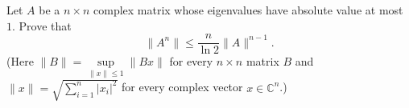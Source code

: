 \documentclass{article}
\begin{document}
\setlength{\parindent}{0pt}
Let $A$ be a $n\times n$ complex matrix whose eigenvalues have absolute value at most $1$. Prove that$$ \|A^n\|\le\dfrac{n}{\ln 2} \|A\|^{n-1}.$$(Here $\|B\|=\sup\limits_{\|x\|\leq1} \|Bx\|$ for every $n\times n$ matrix $B$ and $\|x\|=\sqrt{\sum\limits_{i=1}^n |x_i|^2}$ for every complex vector $x\in\mathbb{C}^n$.)
\end{document}
